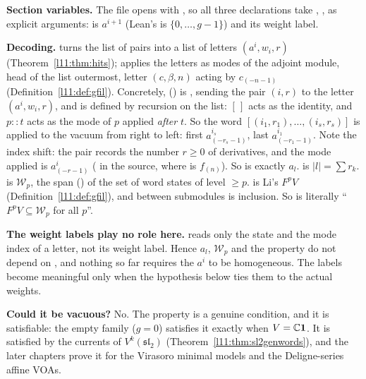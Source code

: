 \begin{dictionary}
\textbf{Section variables.} The file opens with , so all three declarations take , ,  as explicit arguments:  is
$a^{i+1}$ (Lean's  is $\{0,\dots,g-1\}$) and  its weight label.

\textbf{Decoding.}  turns the list of pairs into a list of letters
$(a^{i},w_i,r)$ (Theorem~\ref{l11:thm:hits});  applies the letters as modes of the
adjoint module, head of the list outermost, letter $(c,\beta,n)$ acting by $c_{(-n-1)}$ (Definition~\ref{l11:def:gfil}).
Concretely,  () is , sending the
pair $(i,r)$ to the letter $(a^i,w_i,r)$, and  is defined by recursion on the list:
$[\,]$ acts as the identity, and $p::t$ acts as the mode of $p$ applied \emph{after} $t$. So the word
$[(i_1,r_1),\dots,(i_s,r_s)]$ is applied to the vacuum from right to left: first $a^{i_s}_{(-r_s-1)}$, last
$a^{i_1}_{(-r_1-1)}$. Note the index shift: the pair records the number $r\ge0$ of derivatives, and the mode applied
is $a^i_{(-r-1)}$ ( in the source, where  is $f_{(n)}$).
So  is exactly $a_l$.  is $|l| = \sum r_k$. 
is $\mathcal W_p$, the span () of the set of word states of level $\ge p$.  is Li's
$F^pV$ (Definition~\ref{l11:def:gfil}), and  between submodules is inclusion. So
 is literally ``$F^pV\subseteq \mathcal W_p$ for all $p$''.

\textbf{The weight labels play no role here.}  reads only the state and the mode index of a letter,
not its weight label. Hence $a_l$, $\mathcal W_p$ and the property do not depend on , and nothing so far requires the
$a^i$ to be homogeneous. The labels become meaningful only when the hypothesis  below ties them to the
actual weights.

\textbf{Could it be vacuous?} No. The property is a genuine condition, and it is satisfiable: the empty family
($g=0$) satisfies it exactly when $V={\mathbb{C}}\mathbf{1}$. It is satisfied by the currents of
$V^k(\mathfrak{sl}_2)$ (Theorem~\ref{l11:thm:sl2genwords}), and the later chapters prove it for the Virasoro minimal
models and the Deligne-series affine VOAs.
\end{dictionary}

